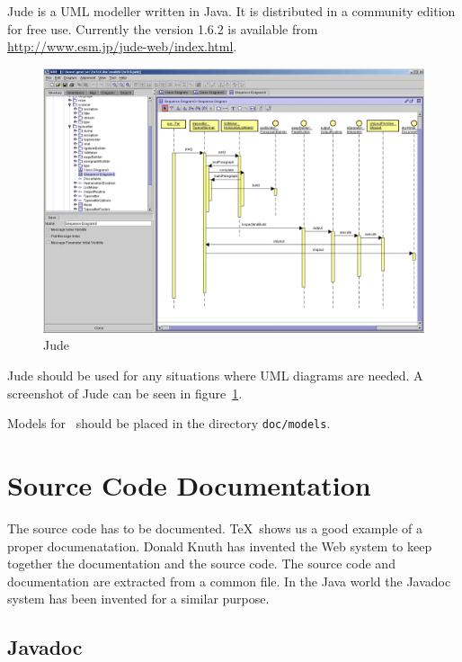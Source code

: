 \documentclass{extex-doc}
\newcommand\File[1]{\texttt{#1}}
\begin{document}
Jude is a UML modeller written in Java. It is distributed in a
community edition for free use. Currently the version 1.6.2 is
available from \url{http://www.esm.jp/jude-web/index.html}. 
\begin{figure}[thp]
  \centering
  \includegraphics[width=\textwidth]{image/jude-seq}
  \caption{Jude}\label{fig:jude}
\end{figure}

Jude should be used for any situations where UML diagrams are needed.
A screenshot of Jude can be seen in figure~\ref{fig:jude}.

Models for \ExTeX\ should be placed in the directory \File{doc/models}.


\chapter{Source Code Documentation}

The source code has to be documented. \TeX\ shows us a good example of
a proper documenatation. Donald Knuth has invented the Web system to
keep together the documentation and the source code. The source code
and documentation are extracted from a common file. In the Java world
the Javadoc system has been invented for a similar purpose. 

\section{Javadoc}
\end{document}
